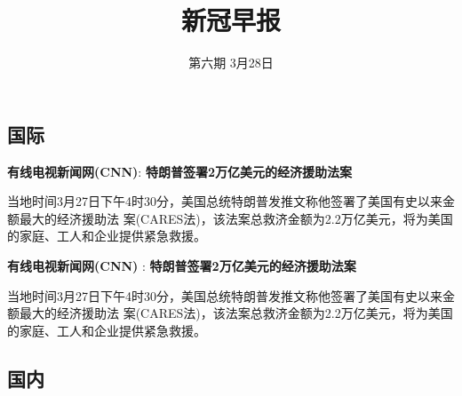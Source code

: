 \documentclass[]{article}
\title{\textcolor{glaucous}{\Huge \textbf {新冠早报}}}
\author{\textcolor{glaucous}{\Large 第六期 3月28日}}
\date{}
\begin{document}
\maketitle

\fontsize{13}{13}
\selectfont

\newcommand{\resheading}[1]{%
  \noindent\fcolorbox{lavenderblush}{lavenderblush}{\makebox[\dimexpr\textwidth-2\fboxsep-2\fboxrule][l]{\textbf{~#1}}}%
}

\pagestyle{fancyplain}

\renewcommand{\headrulewidth}{0pt}
\setlength{\headheight}{50pt}

%
  \noindent{}%

\hypertarget{section}{%
\subsection{\texorpdfstring{\textcolor{glaucous}{\Large 国际}}{}}\label{section}}

\textbf{\textcolor{glaucous}{有线电视新闻网(CNN)}}:
\textbf{特朗普签署2万亿美元的经济援助法案}

当地时间3月27日下午4时30分，美国总统特朗普发推文称他签署了美国有史以来金额最大的经济援助法
案(CARES法)，该法案总救济金额为2.2万亿美元，将为美国的家庭、工人和企业提供紧急救援。

\textbf{\textcolor{glaucous}{有线电视新闻网(CNN)}} :
\textbf{特朗普签署2万亿美元的经济援助法案}

当地时间3月27日下午4时30分，美国总统特朗普发推文称他签署了美国有史以来金额最大的经济援助法
案(CARES法)，该法案总救济金额为2.2万亿美元，将为美国的家庭、工人和企业提供紧急救援。

\hypertarget{section-1}{%
\subsection{\texorpdfstring{\textcolor{glaucous}{\Large 国内}}{}}\label{section-1}}
\end{document}
